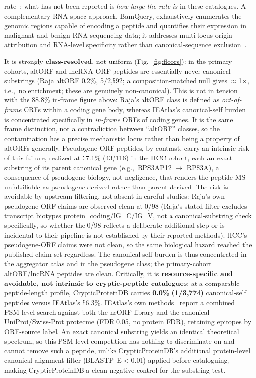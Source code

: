 rate~\cite{r24}; what has not been reported is \emph{how large the rate is} in these catalogues. A complementary RNA-space approach, BamQuery, exhaustively enumerates the genomic regions capable of encoding a peptide and quantifies their expression in malignant and benign RNA-sequencing data; it addresses multi-locus origin attribution and RNA-level specificity rather than canonical-sequence exclusion~\cite{r28}.

It is strongly \textbf{class-resolved}, not uniform (Fig.~\ref{fig:floors}): in the primary cohorts, altORF and lncRNA-ORF peptides are essentially never canonical substrings (Raja altORF 0.2\%, 5/2{,}592; a composition-matched null gives $\approx$1$\times$, i.e.,\ no enrichment; these are genuinely non-canonical). This is not in tension with the 88.8\% in-frame figure above: Raja's altORF class is defined as \emph{out-of-frame} ORFs within a coding gene body, whereas IEAtlas's canonical-self burden is concentrated specifically in \emph{in-frame} ORFs of coding genes. It is the same frame distinction, not a contradiction between ``altORF'' classes, so the contamination has a precise mechanistic locus rather than being a property of altORFs generally. Pseudogene-ORF peptides, by contrast, carry an intrinsic risk of this failure, realized at 37.1\% (43/116) in the HCC cohort, each an exact substring of its parent canonical gene (e.g.,\ RPS3AP12 $\to$ RPS3A), a consequence of pseudogene biology, not negligence, that renders the peptide MS-unfalsifiable as pseudogene-derived rather than parent-derived. The risk is avoidable by upstream filtering, not absent in careful studies: Raja's own pseudogene-ORF claims are observed clean at 0/98 (Raja's stated filter excludes transcript biotypes protein\_coding/IG\_C/IG\_V, not a canonical-substring check specifically, so whether the 0/98 reflects a deliberate additional step or is incidental to their pipeline is not established by their reported methods). HCC's pseudogene-ORF claims were not clean, so the same biological hazard reached the published claim set regardless. The canonical-self burden is thus concentrated in the aggregator atlas and in the pseudogene class; the primary-cohort altORF/lncRNA peptides are clean. Critically, it is \textbf{resource-specific and avoidable, not intrinsic to cryptic-peptide catalogues}: at a comparable peptide-length profile, CrypticProteinDB carries \textbf{0.0\% (1/3{,}774)} canonical-self peptides versus IEAtlas's 56.3\%. IEAtlas's own methods~\cite{r14} report a combined PSM-level search against both the ncORF library and the canonical UniProt/Swiss-Prot proteome (FDR 0.05, no protein FDR), retaining epitopes by ORF-source label. An exact canonical substring yields an identical theoretical spectrum, so this PSM-level competition has nothing to discriminate on and cannot remove such a peptide, unlike CrypticProteinDB's additional protein-level canonical-alignment filter (BLASTP, E$<$0.01) applied before cataloguing, making CrypticProteinDB a clean negative control for the substring test.

